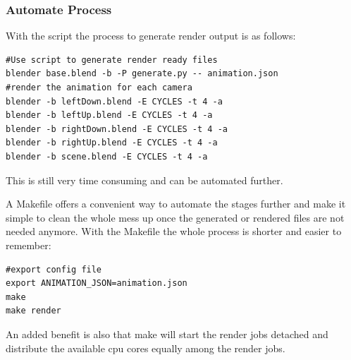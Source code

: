 \subsubsection{Automate Process}
With the script the process to generate render output is as follows:
\textbf{}
\begin{lstlisting}
#Use script to generate render ready files
blender base.blend -b -P generate.py -- animation.json
#render the animation for each camera
blender -b leftDown.blend -E CYCLES -t 4 -a
blender -b leftUp.blend -E CYCLES -t 4 -a
blender -b rightDown.blend -E CYCLES -t 4 -a
blender -b rightUp.blend -E CYCLES -t 4 -a
blender -b scene.blend -E CYCLES -t 4 -a
\end{lstlisting}

This is still very time consuming and can be automated further. 

A Makefile offers a convenient way to automate the stages further and make it simple to clean the whole mess up once the generated or rendered files are not needed anymore. 
With the Makefile the whole process is shorter and easier to remember:
\textbf{}
\begin{lstlisting}
#export config file
export ANIMATION_JSON=animation.json
make
make render
\end{lstlisting}

An added benefit is also that make will start the render jobs detached and distribute the available cpu cores equally among the render jobs.